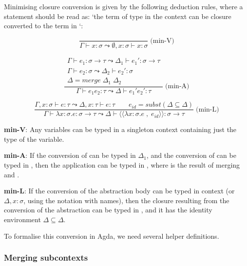 \documentclass[bsc,frontabs,oneside,singlespacing,parskip,deptreport]{infthesis}
\theoremstyle{definition}
\begin{document}
Minimising closure conversion is given by the following deduction
rules, where a statement  should be read as:
`the term  of type  in the context  can be closure
converted to the term  in `:

\begin{minipage}{.5\textwidth}
  \[
    \frac
    {}
    {\Gamma \vdash x : \sigma \leadsto \emptyset , x : \sigma \vdash x : \sigma}
    \;\text{(min-V)}
  \]
\end{minipage}%
\begin{minipage}{.5\textwidth}
  \[
    \frac
    {
      \begin{matrix}
        \Gamma \vdash e_1 : \sigma \to \tau \leadsto \Delta_1 \vdash
        e_1' : \sigma \to \tau \\
        \Gamma \vdash e_2 : \sigma \leadsto \Delta_2 \vdash e_2' :
        \sigma \\
        \Delta = merge \; \Delta_1 \; \Delta_2
      \end{matrix}
      }
    {\Gamma ⊢ e_1 e_2 : \tau  \leadsto \Delta  \vdash e_1' e_2' : \tau}
     \;\text{(min-A)}
  \]
\end{minipage}

\[
  \frac {\Gamma , x : \sigma ⊢ e : \tau \leadsto \Delta , x : \tau
    \vdash e : \tau \quad \quad e_{id} = subst ( \Delta \subseteq
    \Delta )}
  {\Gamma \vdash \lambda x : \sigma . e : \sigma \to \tau \leadsto
    \Delta \vdash \langle\langle \lambda x : \sigma . e \; , \; e_{id}
    \rangle\rangle : \sigma \to \tau} \; \text{(min-L)}
\]

\textbf{min-V}: Any variables can be typed in a singleton context
containing just the type of the variable.

\textbf{min-A}: If the conversion  of  can be typed in
$\Delta_1$, and the conversion  of  can be typed in ,
then the application  can be typed in , where 
is the result of merging  and .

\textbf{min-L}: If the conversion  of the abstraction body
 can be typed in context  (or $\Delta, x : \sigma$,
using the notation with names), then the closure resulting from the
conversion of the abstraction can be typed in , and it has the
identity environment $\Delta \subseteq \Delta$.

To formalise this conversion in Agda, we need several helper
definitions.

\subsubsection{Merging subcontexts}
\label{sec:merging-subcontexts}
\end{document}
